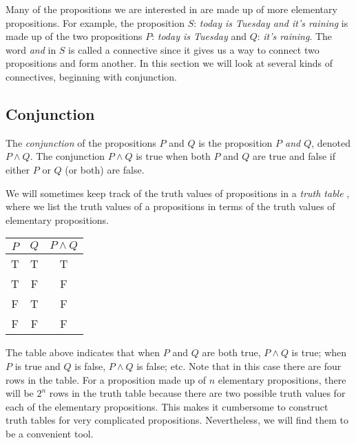 Many of the propositions we are interested in are made up of more elementary propositions. For example, the proposition $S$: \emph{today is Tuesday and it's raining} is made up of the two propositions $P$: \emph{today is Tuesday} and $Q$: \emph{it's raining}. The word \emph{and} in $S$ is called a connective  since it gives us a way to connect two propositions and form another.  In this section we will look at several kinds of connectives, beginning with conjunction.

\subsection{Conjunction} 

\begin{definition}
The \emph{conjunction}  of the propositions $P$ and $Q$ is the proposition \emph{$P$ and $Q$}, denoted $P\land Q$. The conjunction $P\land Q$ is true when both $P$ and $Q$ are true and false if either $P$ or $Q$ (or both) are false. 
\end{definition}

We will sometimes keep track of the truth values  of propositions in a \emph{truth table} , where we list the truth values of a propositions in terms of the truth values of elementary propositions.

\begin{center}
\begin{tabular}[t]{|c|c|c|}
\hline
$P$ & $Q$ & $P\land Q$ \\
\hline
\hline
T & T & T \\
\hline
T & F & F \\
\hline
F & T & F \\
\hline
F & F & F \\
\hline
\end{tabular}
\end{center}

The table above indicates that when $P$ and $Q$ are both true, $P\land Q$ is true; when $P$ is true and $Q$ is false, $P\land Q$ is false; etc. Note that in this case there are four rows in the table. For a proposition made up of $n$ elementary propositions, there will be $2^n$ rows in the truth table because there are two possible truth values for each of the elementary propositions. This makes it cumbersome to construct truth tables for very complicated propositions. Nevertheless, we will find them to be a convenient tool.

